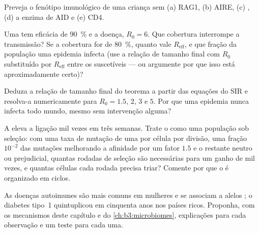 \begin{exercise}[$\star\star$]\label{exo:b3:adaptive-immunity:8}
Preveja o fenótipo imunológico de uma criança sem (a) RAG1, (b) AIRE,
(c) , (d) a enzima de  AID e (e)  CD4.
\end{exercise}

\begin{exercise}[$\star\star$]\label{exo:b3:adaptive-immunity:9}
Uma  tem eficácia de \qty{90}{\%} e a doença, $R_{0} = 6$. Que
cobertura interrompe a transmissão? Se a cobertura for de \qty{80}{\%},
quanto vale $R_{\text{eff}}$, e que fração da população uma epidemia
infecta (use a relação de tamanho final com $R_{0}$ substituído por
$R_{\text{eff}}$ entre os suscetíveis --- ou argumente por que isso está
aproximadamente certo)?
\end{exercise}

\begin{exercise}[$\star\star\star$]\label{exo:b3:adaptive-immunity:10}
Deduza a relação de tamanho final do teorema a partir das equações do
SIR e resolva-a numericamente para $R_{0} = 1.5$, $2$, $3$ e $5$. Por
que uma epidemia nunca infecta todo mundo, mesmo sem intervenção alguma?
\end{exercise}

\begin{exercise}[$\star\star\star$]\label{exo:b3:adaptive-immunity:11}
A  eleva a ligação mil vezes em três semanas.
Trate o  como uma população sob seleção: com uma taxa
de mutação de uma por célula por divisão, uma fração $10^{-2}$ das
mutações melhorando a afinidade por um fator $1.5$ e o restante neutro
ou prejudicial, quantas rodadas de seleção são necessárias para um ganho
de mil vezes, e quantas células cada rodada precisa triar? Comente por
que o  é organizado em ciclos.
\end{exercise}

\begin{exercise}[$\star\star\star$]\label{exo:b3:adaptive-immunity:12}
As doenças autoimunes são mais comuns em mulheres e se associam a
alelos ; o diabetes tipo~1 quintuplicou em cinquenta anos nos países
ricos. Proponha, com os mecanismos deste capítulo e do
\cref{ch:b3:microbiomes}, explicações para cada observação e um teste
para cada uma.
\end{exercise}

